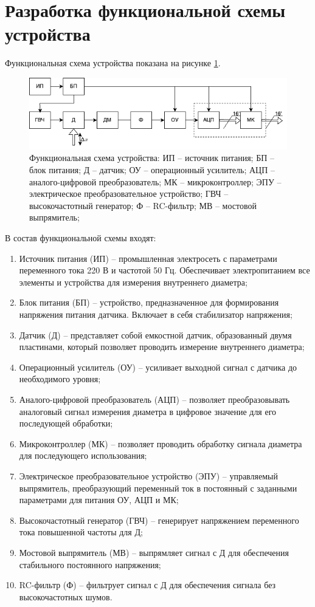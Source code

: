 \section{Разработка функциональной схемы устройства}
Функциональная схема устройства показана на рисунке \ref{fig:func_scheme}. 
\begin{figure}[ht]
	\centering
	\includegraphics[width=\textwidth]{./images/func_scheme.png}
	\caption{Функциональная схема устройства: ИП -- источник питания; БП -- блок питания; Д -- датчик; ОУ -- операционный усилитель; АЦП -- аналого-цифровой преобразователь; МК -- микроконтроллер; ЭПУ -- электрическое преобразовательное устройство; ГВЧ -- высокочастотный генератор; Ф -- RC-фильтр; МВ -- мостовой выпрямитель;}
	\label{fig:func_scheme}
\end{figure}

В состав функциональной схемы входят:
\begin{enumerate}
	\item Источник питания (ИП) -- промышленная электросеть с параметрами переменного тока 220 В и частотой 50 Гц. Обеспечивает электропитанием все элементы и устройства для измерения внутреннего диаметра;
	\item Блок питания (БП) -- устройство, предназначенное для формирования напряжения питания датчика. Включает в себя стабилизатор напряжения;
	\item Датчик (Д) -- представляет собой емкостной датчик, образованный двумя пластинами, который позволяет проводить измерение внутреннего диаметра;
	\item Операционный усилитель (ОУ) -- усиливает выходной сигнал с датчика до необходимого уровня;
	\item Аналого-цифровой преобразователь (АЦП) -- позволяет преобразовывать аналоговый сигнал измерения диаметра в цифровое значение для его последующей обработки;
	\item Микроконтроллер (МК) -- позволяет проводить обработку сигнала диаметра для последующего использования;
	\item Электрическое преобразовательное устройство (ЭПУ) -- управляемый выпрямитель, преобразующий переменный ток в постоянный с заданными параметрами для питания ОУ, АЦП и МК;
	\item Высокочастотный генератор (ГВЧ) -- генерирует напряжением переменного тока повышенной частоты для Д;
	\item Мостовой выпрямитель (МВ) -- выпрямляет сигнал с Д для обеспечения стабильного постоянного напряжения;
	\item RC-фильтр (Ф) -- фильтрует сигнал с Д для обеспечения сигнала без высокочастотных шумов.
\end{enumerate}

